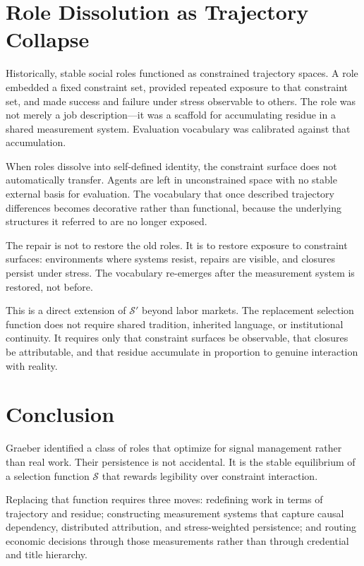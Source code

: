 \documentclass[12pt]{article}
\begin{document}
\section{Role Dissolution as Trajectory Collapse}

Historically, stable social roles functioned as constrained trajectory
spaces. A role embedded a fixed constraint set, provided repeated
exposure to that constraint set, and made success and failure under
stress observable to others. The role was not merely a job
description---it was a scaffold for accumulating residue in a shared
measurement system. Evaluation vocabulary was calibrated against that
accumulation.

When roles dissolve into self-defined identity, the constraint surface
does not automatically transfer. Agents are left in unconstrained space
with no stable external basis for evaluation. The vocabulary that once
described trajectory differences becomes decorative rather than
functional, because the underlying structures it referred to are no
longer exposed.

The repair is not to restore the old roles. It is to restore exposure
to constraint surfaces: environments where systems resist, repairs are
visible, and closures persist under stress. The vocabulary re-emerges
after the measurement system is restored, not before.

This is a direct extension of $\mathcal{S}'$ beyond labor markets. The
replacement selection function does not require shared tradition,
inherited language, or institutional continuity. It requires only that
constraint surfaces be observable, that closures be attributable, and
that residue accumulate in proportion to genuine interaction with
reality.

\section{Conclusion}

Graeber identified a class of roles that optimize for signal management
rather than real work. Their persistence is not accidental. It is the
stable equilibrium of a selection function $\mathcal{S}$ that rewards
legibility over constraint interaction.

Replacing that function requires three moves: redefining work in terms
of trajectory and residue; constructing measurement systems that capture
causal dependency, distributed attribution, and stress-weighted
persistence; and routing economic decisions through those measurements
rather than through credential and title hierarchy.
\end{document}
